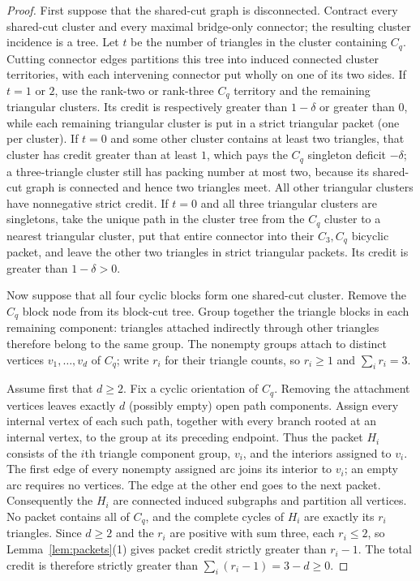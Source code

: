 \documentclass[11pt]{article}
\theoremstyle{remark}
\begin{document}
\begin{proof}
First suppose that the shared-cut graph is disconnected.  Contract every
shared-cut cluster and every maximal bridge-only connector; the resulting
cluster incidence is a tree.  Let $t$ be the number of triangles in the
cluster containing $C_q$.  Cutting connector edges partitions this tree into
induced connected cluster territories, with each intervening connector put
wholly on one of its two sides.  If $t=1$ or $2$, use the rank-two or
rank-three $C_q$ territory and the remaining triangular clusters.  Its credit
is respectively greater than $1-\delta$ or greater than $0$, while each
remaining triangular cluster is put in a strict triangular packet (one per
cluster).  If
$t=0$ and some other cluster contains at least two triangles, that cluster has
credit greater than at least $1$, which pays the $C_q$ singleton deficit
$-\delta$; a three-triangle cluster still has packing number at most two,
because its shared-cut graph is connected and hence two triangles meet.  All
other triangular clusters have nonnegative strict credit.  If
$t=0$ and all three triangular clusters are singletons, take the unique path
in the cluster tree from the $C_q$ cluster to a nearest triangular cluster,
put that entire connector into their $C_3,C_q$ bicyclic packet, and leave the
other two triangles in strict triangular packets.  Its credit is greater than
$1-\delta>0$.

Now suppose that all four cyclic blocks form one shared-cut cluster.  Remove
the $C_q$ block node from its block-cut tree.  Group together the triangle
blocks in each remaining component: triangles attached indirectly through
other triangles therefore belong to the same group.  The nonempty groups
attach to distinct vertices $v_1,\ldots,v_d$ of $C_q$; write $r_i$ for their
triangle counts, so $r_i\geq1$ and $\sum_i r_i=3$.

Assume first that $d\geq2$.  Fix a cyclic orientation of $C_q$.  Removing the
attachment vertices leaves exactly $d$ (possibly empty) open path components.
Assign every internal vertex of each such path, together with every branch
rooted at an internal vertex, to the group at its preceding endpoint.  Thus
the packet $H_i$ consists of the $i$th triangle component group, $v_i$, and
the interiors assigned to $v_i$.  The first edge of every nonempty assigned
arc joins its interior to $v_i$; an empty arc requires no vertices.  The edge
at the other end goes to the next packet.  Consequently the $H_i$ are
connected induced subgraphs and partition all vertices.  No packet contains
all of $C_q$, and the complete cycles of $H_i$ are exactly its $r_i$
triangles.  Since $d\geq2$ and the $r_i$ are positive with sum three, each
$r_i\leq2$, so Lemma~\ref{lem:packets}(1) gives packet credit strictly greater
than $r_i-1$.  The total credit is therefore strictly greater than
$\sum_i(r_i-1)=3-d\geq0$.


\end{proof}
\end{document}
